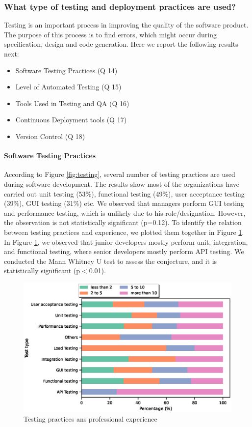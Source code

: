 \subsubsection{What type of testing and deployment practices are used?}
\label{testing_practices}

Testing is an important process in improving the quality of the software product. The purpose of this process is to find errors, which might occur during specification, design and code generation. Here we report the following results next:
\begin{itemize}
\item Software Testing Practices (Q 14)
\item Level of Automated Testing (Q 15)
\item Tools Used in Testing and QA (Q 16)
\item Continuous Deployment tools (Q 17)
\item Version Control (Q 18)
\end{itemize}


\paragraph{Software Testing Practices}
According to Figure \ref{fig:testing}, several number of testing practices are used during software development. The results show most of the organizations have carried out unit testing (53\%), functional testing (49\%), user acceptance testing (39\%), GUI testing (31\%) etc. We observed that managers perform GUI testing and performance testing, which is unlikely due to his role/designation. However, the observation is not statistically significant (p=0.12). To identify the relation between testing practices and experience, we plotted them together in Figure \ref{fig:testing type and experience}. In Figure \ref{fig:testing type and experience}, we observed that junior developers mostly perform unit, integration, and functional testing, where senior developers mostly perform API testing. We conducted the Mann Whitney U test to assess the conjecture, and it is statistically significant (p$<$0.01).
\begin{figure}[h]
\centering
  \includegraphics[scale=0.6]{Figures/Testing_Type_and_Experience}
  \caption{Testing practices ans professional experience}
  \label{fig:testing type and experience}
\end{figure}

